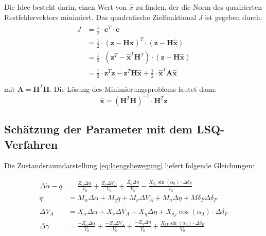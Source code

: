 Die Idee besteht darin, einen Wert von $\hat{x}$ zu finden, der die Norm des quadrierten Restfehlervektors minimiert. Das 
quadratische Zielfunktional $J$ ist gegeben durch: 
\begin{align}
   \begin{split}
     J &= \frac{1}{2} \cdot \mathbf{e}^{T} \cdot \mathbf{e} \\
     &= \frac{1}{2} \cdot {(\mathbf{z}- \mathbf{H}\mathbf{\hat{x}})}^{T}\cdot(\mathbf{z}- \mathbf{H}\mathbf{\hat{x}}) \\
     &= \frac{1}{2} \cdot (\mathbf{z}^{T} -\mathbf{\hat{x}}^{T}\mathbf{H}^{T})\cdot(\mathbf{z}- \mathbf{H}\mathbf{\hat{x}}) \\
     &= \frac{1}{2} \cdot \mathbf{z}^{T}\mathbf{z} - \mathbf{z}^{T}\mathbf{H}\mathbf{\hat{x}} + \frac{1}{2}\cdot 
     {\mathbf{\hat{x}}}^{T}\mathbf{A}\mathbf{\hat{x}}  \\
   \end{split}
\end{align}
mit $\mathbf{A} = \mathbf{H}^{T} \mathbf{H}$. Die Lösung des Minimierungsproblems lautet dann:
\begin{equation}
    \hat{\mathbf{x}}= {(\mathbf{H}^{T} \mathbf{H})}^{-1} \cdot \mathbf{H}^{T} \mathbf{z} 
    \label{eq:minProblemLoesung}
\end{equation}


\subsection{Schätzung der Parameter mit dem LSQ-Verfahren} 

Die Zustandsraumdarstellung \eqref{eq:laengsbewegung} liefert folgende Gleichungen: 

\begin{align}
	\Delta\dot \alpha-q &=  \frac{Z_{\alpha}\Delta\alpha}{V_0} + \frac{Z_{\nu}\Delta V_{A}}{V_0} + 
	\frac{Z_{\eta}\Delta\eta}{V_0} - \frac{X_{\delta_F}\sin{(\alpha_0)}\cdot\Delta\delta_F}{V_0}\\
	\dot q &= M_{\alpha}\Delta\alpha + M_q q + M_{\nu}\Delta V_A + M_{\eta}\Delta\eta + M{\delta_F}\Delta\delta_F\\
	\Delta\dot V_A &= X_{\alpha}\Delta\alpha +  X_{\nu}\Delta V_A + X_{\eta}\Delta\eta + 
	X_{\delta_F}\cos{(\alpha_0)}\cdot\Delta\delta_F \\
	\Delta \dot \gamma &= \frac{- Z_{\alpha}\Delta\alpha}{V_0} + \frac{- Z_{\nu}\Delta V_{A}}{V_0} + 
	\frac{-Z_{\eta}\Delta\eta}{V_0} + \frac{X_{\delta F}\sin{(\alpha_0)}\cdot\Delta\delta_F}{V_0}
\end{align}
	
